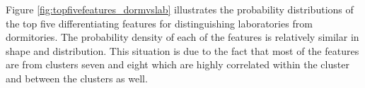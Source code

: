 Figure \ref{fig:topfivefeatures_dormvslab} illustrates the probability distributions of the top five differentiating features for distinguishing laboratories from dormitories. The probability density of each of the features is relatively similar in shape and distribution. This situation is due to the fact that most of the features are from clusters seven and eight which are highly correlated within the cluster and between the clusters as well.